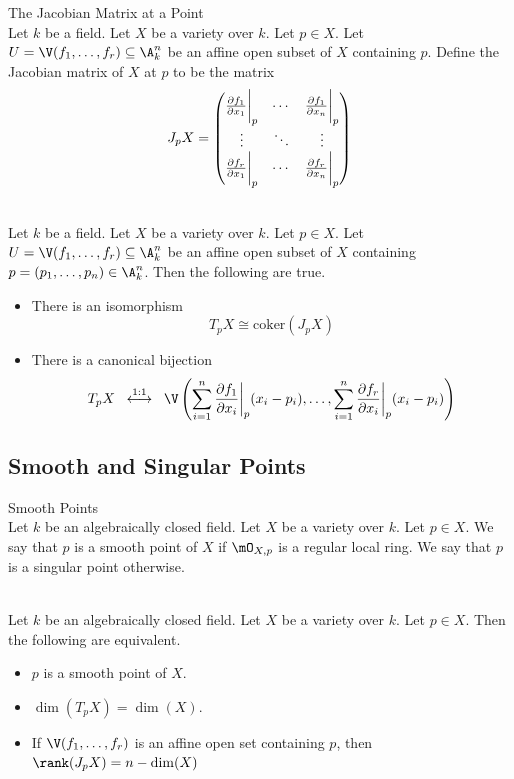 \documentclass[a4paper]{article}
\begin{document}
\begin{defn}{The Jacobian Matrix at a Point}{}\\
Let $k$ be a field. Let $X$ be a variety over $k$. Let $p\in X$. Let $U=\V(f_1,\dots,f_r)\subseteq\A_k^n$ be an affine open subset of $X$ containing $p$. Define the Jacobian matrix of $X$ at $p$ to be the matrix $$J_pX=\begin{pmatrix}
\frac{\partial f_1}{\partial x_1}\bigg{|}_p & \cdots & \frac{\partial f_1}{\partial x_n}\bigg{|}_p\\
\vdots & \ddots & \vdots\\
\frac{\partial f_r}{\partial x_1}\bigg{|}_p & \cdots & \frac{\partial f_r}{\partial x_n}\bigg{|}_p
\end{pmatrix}$$
\end{defn}

\begin{prp}{}{}\\
Let $k$ be a field. Let $X$ be a variety over $k$. Let $p\in X$. Let $U=\V(f_1,\dots,f_r)\subseteq\A_k^n$ be an affine open subset of $X$ containing $p=(p_1,\dots,p_n)\in\A_k^n$. Then the following are true. 
\begin{itemize}
\item There is an isomorphism $$T_pX\cong\text{coker}(J_pX)$$
\item There is a canonical bijection $$T_pX\;\;\overset{1:1}{\longleftrightarrow}\;\;\V\left(\sum_{i=1}^n\frac{\partial f_1}{\partial x_i}\bigg{|}_p(x_i-p_i),\dots,\sum_{i=1}^n\frac{\partial f_r}{\partial x_i}\bigg{|}_p(x_i-p_i)\right)$$
\end{itemize}
\end{prp}

\subsection{Smooth and Singular Points}
\begin{defn}{Smooth Points}{}\\
Let $k$ be an algebraically closed field. Let $X$ be a variety over $k$. Let $p\in X$. We say that $p$ is a smooth point of $X$ if $\mO_{X,p}$ is a regular local ring. We say that $p$ is a singular point otherwise. 
\end{defn}

\begin{prp}{}{}\\
Let $k$ be an algebraically closed field. Let $X$ be a variety over $k$. Let $p\in X$. Then the following are equivalent. 
\begin{itemize}
\item $p$ is a smooth point of $X$. 
\item $\dim(T_pX)=\dim(X)$. 
\item If $\V(f_1,\dots,f_r)$ is an affine open set containing $p$, then $\rank(J_pX)=n-\dim(X)$
\end{itemize}
\end{prp}
\end{document}
